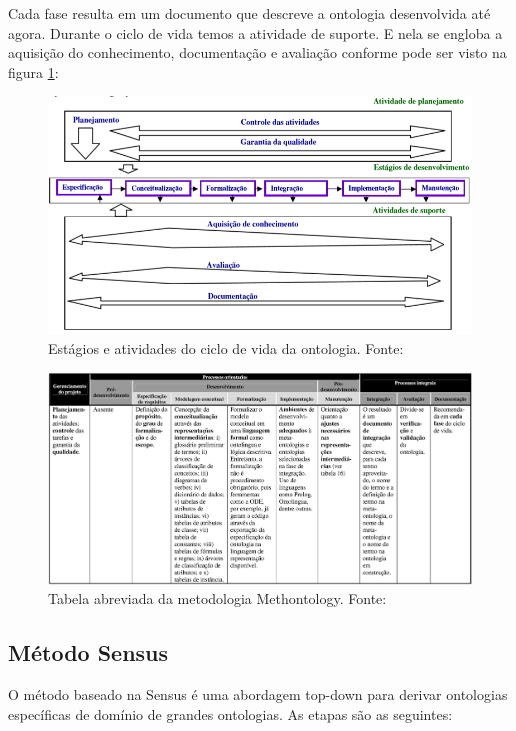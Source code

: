 Cada fase resulta em um documento que descreve a ontologia desenvolvida até agora. Durante o ciclo de vida temos a
atividade de suporte. E nela se engloba a aquisição do conhecimento, documentação e avaliação conforme pode ser visto
na figura \ref{fig:estagios_methontology}:

\begin{figure}[h] 
\centering
\includegraphics[scale=0.5]{Figuras/8.png} 
\caption[Estágios e atividades do ciclo de vida da ontologia]
{Estágios e atividades do ciclo de vida da ontologia. Fonte: \cite{DanielaLucas2008}}
\label{fig:estagios_methontology}
\end{figure}

\pagebreak

\begin{figure}[h] 
\centering 
\includegraphics[scale=0.4]{Figuras/9.png} 
\caption[Tabela abreviada da metodologia Methontology]
{Tabela abreviada da metodologia Methontology. Fonte: \cite{DanielaLucas2008}}
\end{figure}
 
\subsection{Método Sensus} 
 O método baseado na Sensus é uma abordagem top-down para derivar ontologias específicas de domínio de grandes ontologias.
 As etapas são as seguintes:
 
